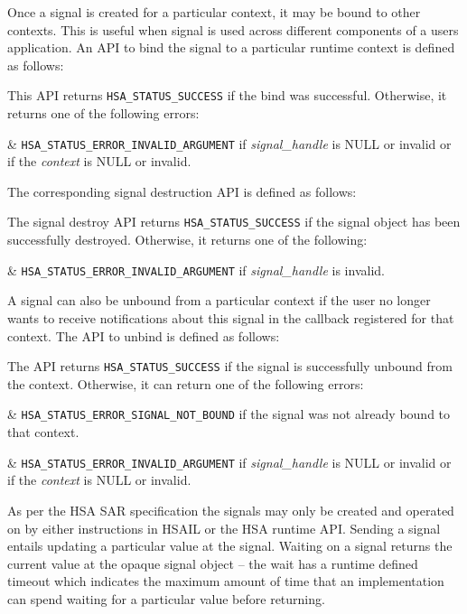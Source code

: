 Once a signal is created for a particular context, it may be bound
to other contexts. This is useful when signal is used across
different components of a users application. An API to bind the
signal to a particular runtime context is defined as follows:



This API returns \texttt{HSA\_STATUS\_SUCCESS} if the bind was
successful. Otherwise, it returns one of the following errors:

\begin{easylist}
& \texttt{HSA\_STATUS\_ERROR\_INVALID\_ARGUMENT} if {\itshape
signal\_handle} is NULL or invalid or if the {\itshape context} is
NULL or invalid. 
\end{easylist}

The corresponding signal destruction API is defined as follows:


The signal destroy API returns \texttt{HSA\_STATUS\_SUCCESS} if the
signal object has been successfully destroyed. Otherwise, it returns
one of the following:

\begin{easylist}
& \texttt{HSA\_STATUS\_ERROR\_INVALID\_ARGUMENT} if {\itshape
signal\_handle} is invalid.
\end{easylist}

A signal can also be unbound from a particular context if the user
no longer wants to receive notifications about this signal in the
callback registered for that context. The API to unbind is defined
as follows:



The API returns \texttt{HSA\_STATUS\_SUCCESS} if the signal is
successfully unbound from the context. Otherwise, it can return one
of the following errors:

\begin{easylist}
& \texttt{HSA\_STATUS\_ERROR\_SIGNAL\_NOT\_BOUND} if the signal was
not already bound to that context.

& \texttt{HSA\_STATUS\_ERROR\_INVALID\_ARGUMENT} if {\itshape
signal\_handle} is NULL or invalid or if the {\itshape context} is
NULL or invalid. 
\end{easylist}

As per the HSA SAR specification the signals may only be created and
operated on by either instructions in HSAIL or the HSA runtime API.
Sending a signal entails updating a particular value at the signal.
Waiting on a signal returns the current value at the opaque signal
object -- the wait has a runtime defined timeout which indicates the
maximum amount of time that an implementation can spend waiting for
a particular value before returning. 

